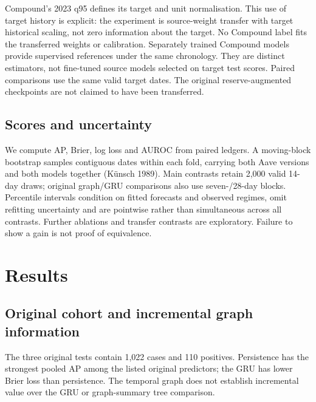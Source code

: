 \documentclass[
  10pt,
  a4paper,
]{article}
\begin{document}
Compound's 2023 q95 defines its target and unit normalisation. This use
of target history is explicit: the experiment is source-weight transfer
with target historical scaling, not zero information about the target.
No Compound label fits the transferred weights or calibration.
Separately trained Compound models provide supervised references under
the same chronology. They are distinct estimators, not fine-tuned source
models selected on target test scores. Paired comparisons use the same
valid target dates. The original reserve-augmented checkpoints are not
claimed to have been transferred.

\subsection{Scores and uncertainty}\label{scores-and-uncertainty}

We compute AP, Brier, log loss and AUROC from paired ledgers. A
moving-block bootstrap samples contiguous dates within each fold,
carrying both Aave versions and both models together (Künsch 1989). Main
contrasts retain 2,000 valid 14-day draws; original graph/GRU
comparisons also use seven-/28-day blocks. Percentile intervals
condition on fitted forecasts and observed regimes, omit refitting
uncertainty and are pointwise rather than simultaneous across all
contrasts. Further ablations and transfer contrasts are exploratory.
Failure to show a gain is not proof of equivalence.

\section{Results}\label{results}

\subsection{Original cohort and incremental graph
information}\label{original-cohort-and-incremental-graph-information}

The three original tests contain 1,022 cases and 110 positives.
Persistence has the strongest pooled AP among the listed original
predictors; the GRU has lower Brier loss than persistence. The temporal
graph does not establish incremental value over the GRU or graph-summary
tree comparison.
\end{document}
